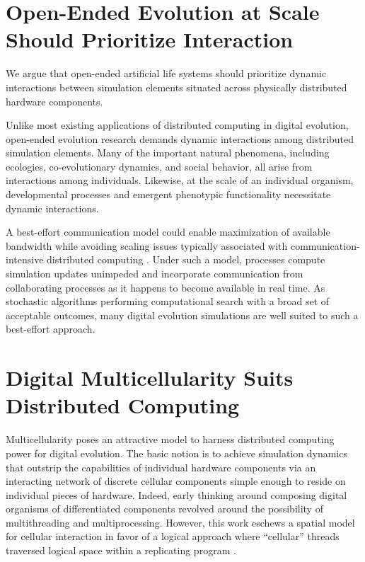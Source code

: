 \section{Open-Ended Evolution at Scale Should Prioritize Interaction}

We argue that open-ended artificial life systems should prioritize dynamic interactions between simulation elements situated across physically distributed hardware components.

Unlike most existing applications of distributed computing in digital evolution, open-ended evolution research demands dynamic interactions among distributed simulation elements.
Many of the important natural phenomena, including ecologies, co-evolutionary dynamics, and social behavior, all arise from interactions among individuals.
Likewise, at the scale of an individual organism, developmental processes and emergent phenotypic functionality necessitate dynamic interactions.

A best-effort communication model could enable maximization of available bandwidth \citep{byna2010best} while avoiding scaling issues typically associated with communication-intensive distributed computing \citep{cardwell2019extended}.
Under such a model, processes compute simulation updates unimpeded and incorporate communication from collaborating processes as it happens to become available in real time.
As stochastic algorithms performing computational search with a broad set of acceptable outcomes, many digital evolution simulations are well suited to such a best-effort approach.

\section{Digital Multicellularity Suits Distributed Computing}

Multicellularity poses an attractive model to harness distributed computing power for digital evolution.
The basic notion is to achieve simulation dynamics that outstrip the capabilities of individual hardware components via an interacting network of discrete cellular components simple enough to reside on individual pieces of hardware.
Indeed, early thinking around composing digital organisms of differentiated components revolved around the possibility of multithreading and multiprocessing.
However, this work eschews a spatial model for cellular interaction in favor of a logical approach where ``cellular'' threads traversed logical space within a replicating program \citep{ofria1999evolution,ray2000evolution}.

